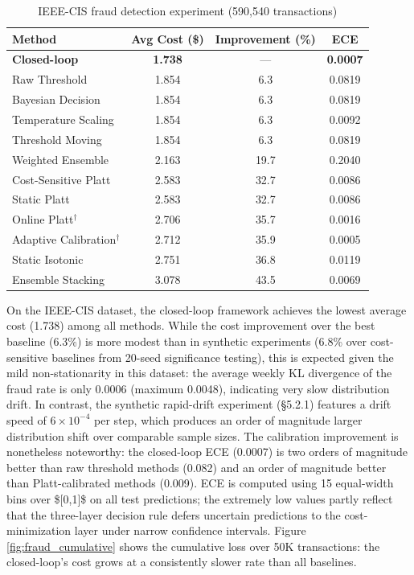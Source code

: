 \documentclass[12pt,a4paper]{article}
\begin{document}
\begin{table}[t]
\centering
\caption{IEEE-CIS fraud detection experiment (590,540 transactions)}
\label{tab:fraud}
\begin{tabular}{lccc}
\toprule
Method & Avg Cost (\$) & Improvement (\%) & ECE \\
\midrule
\textbf{Closed-loop} & \textbf{1.738} & --- & \textbf{0.0007} \\
Raw Threshold & 1.854 & 6.3 & 0.0819 \\
Bayesian Decision & 1.854 & 6.3 & 0.0819 \\
Temperature Scaling & 1.854 & 6.3 & 0.0092 \\
Threshold Moving & 1.854 & 6.3 & 0.0819 \\
Weighted Ensemble & 2.163 & 19.7 & 0.2040 \\
Cost-Sensitive Platt & 2.583 & 32.7 & 0.0086 \\
Static Platt & 2.583 & 32.7 & 0.0086 \\
Online Platt$^\dagger$ & 2.706 & 35.7 & 0.0016 \\
Adaptive Calibration$^\dagger$ & 2.712 & 35.9 & 0.0005 \\
Static Isotonic & 2.751 & 36.8 & 0.0119 \\
Ensemble Stacking & 3.078 & 43.5 & 0.0069 \\
\bottomrule
\end{tabular}

\end{table}

On the IEEE-CIS dataset, the closed-loop framework achieves the lowest average cost (1.738) among all methods. While the cost improvement over the best baseline (6.3\%) is more modest than in synthetic experiments (6.8\% over cost-sensitive baselines from 20-seed significance testing), this is expected given the mild non-stationarity in this dataset: the average weekly KL divergence of the fraud rate is only 0.0006 (maximum 0.0048), indicating very slow distribution drift. In contrast, the synthetic rapid-drift experiment (\S5.2.1) features a drift speed of $6 \times 10^{-4}$ per step, which produces an order of magnitude larger distribution shift over comparable sample sizes. The calibration improvement is nonetheless noteworthy: the closed-loop ECE (0.0007) is two orders of magnitude better than raw threshold methods (0.082) and an order of magnitude better than Platt-calibrated methods (0.009). ECE is computed using 15 equal-width bins over \$[0,1]\$ on all test predictions; the extremely low values partly reflect that the three-layer decision rule defers uncertain predictions to the cost-minimization layer under narrow confidence intervals. Figure \ref{fig:fraud_cumulative} shows the cumulative loss over 50K transactions: the closed-loop's cost grows at a consistently slower rate than all baselines.
\end{document}
